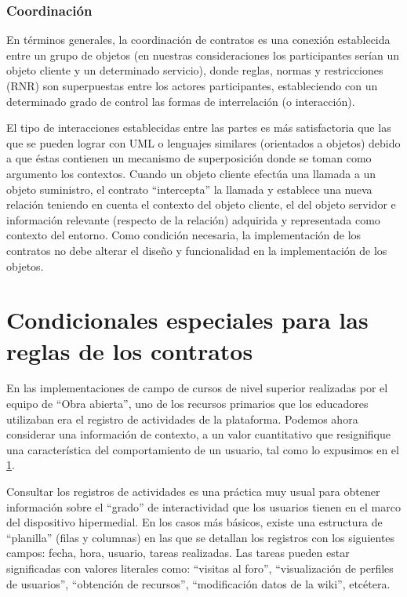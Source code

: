 \subsubsection {Coordinación}

En términos generales, la coordinación de contratos es una conexión establecida
entre un grupo de objetos (en nuestras consideraciones los participantes
serían un objeto cliente y un determinado servicio), donde reglas, normas y
restricciones (RNR) son superpuestas entre los actores participantes, estableciendo
con un determinado grado de control las formas de interrelación (o
interacción).

El tipo de interacciones establecidas entre las partes es más satisfactoria
que las que se pueden lograr con UML o lenguajes similares (orientados a objetos)
debido a que éstas contienen un mecanismo de superposición donde se
toman como argumento los contextos. Cuando un objeto cliente efectúa una
llamada a un objeto suministro, el contrato “intercepta” la llamada y establece
una nueva relación teniendo en cuenta el contexto del objeto cliente, el
del objeto servidor e información relevante (respecto de la relación) adquirida
y representada como contexto del entorno. Como condición necesaria, la
implementación de los contratos no debe alterar el diseño y funcionalidad en
la implementación de los objetos.


\section{Condicionales especiales para las reglas de los contratos}

En las implementaciones de campo de cursos de nivel superior realizadas por
el equipo de “Obra abierta”, uno de los recursos primarios que los educadores
utilizaban era el registro de actividades de la plataforma. Podemos ahora considerar
una información de contexto, a un valor cuantitativo que resignifique
una característica del comportamiento de un usuario, tal como lo expusimos
en el \ref{}.

Consultar los registros de actividades es una práctica muy usual para obtener
información sobre el “grado” de interactividad que los usuarios tienen en el
marco del dispositivo hipermedial. En los casos más básicos, existe una estructura
de “planilla” (filas y columnas) en las que se detallan los registros con los
siguientes campos: fecha, hora, usuario, tareas realizadas. Las tareas pueden estar
significadas con valores literales como: “visitas al foro”, “visualización de perfiles
de usuarios”, “obtención de recursos”, “modificación datos de la wiki”, etcétera.


